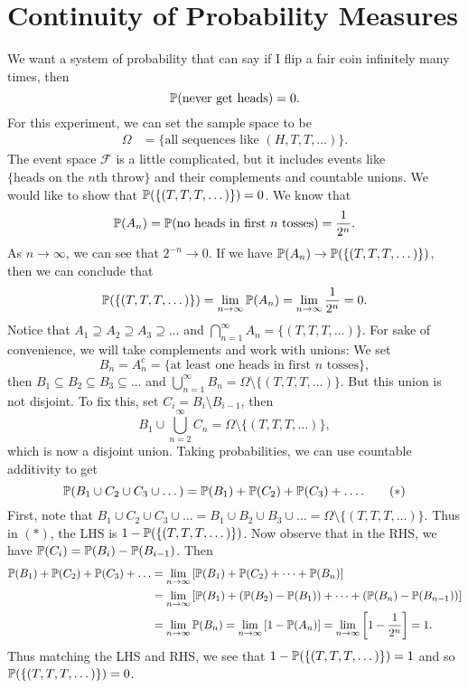 \section{Continuity of Probability Measures}
\begin{remark}
  We want a system of probability that can say
  if I flip a fair coin infinitely many times,
  then
  \[
    \mathbb{P}(\text{never get heads}) = 0
  .\]
  For this experiment, we can set the sample
  space to be
  \begin{align*}
    \Omega &= \{\text{all sequences like } (H, T, T, \dots)\}.
  \end{align*}
  The event space $\mathcal{F}$ is a little
  complicated, but it includes events like
  $\{\text{heads on the $n$th throw}\}$ and their
  complements and countable unions. We would like
  to show that $\mathbb{P}(\{(T, T, T, \dots)\}) = 0$.
  We know that
  \[
    \mathbb{P}(A_n) = \mathbb{P}(\text{no heads in first $n$ tosses}) = \frac{1}{2^n}.
  \]
  As $n \to \infty$, we can see that $2^{-n} \to 0$.
  If we have
  $\mathbb{P}(A_n) \to \mathbb{P}(\{(T, T, T, \dots)\})$, then
  we can conclude that
  \[
    \mathbb{P}(\{(T, T, T, \dots)\})
    = \lim_{n \to \infty} \mathbb{P}(A_n)
    = \lim_{n \to \infty} \frac{1}{2^n} = 0.
  \]
  Notice that $A_1 \supseteq A_2 \supseteq A_3 \supseteq \dots$
  and $\bigcap_{n = 1}^\infty A_n = \{(T, T, T, \dots)\}$.
  For sake of convenience, we will take
  complements and work with unions: We set
  \[
    B_n = A_n^c = \{\text{at least one heads in first $n$ tosses}\},
  \]
  then $B_1 \subseteq B_2 \subseteq B_3 \subseteq \dots$
  and $\bigcup_{n = 1}^\infty B_n = \Omega \setminus \{(T, T, T, \dots)\}$.
  But this union is not disjoint. To fix this, set
  $C_i = B_i \setminus B_{i - 1}$, then
  \[
    B_1 \cup \bigcup_{n = 2}^\infty C_n = \Omega \setminus \{(T, T, T, \dots)\},
  \]
  which is now a disjoint union. Taking probabilities,
  we can use countable additivity to get
  \[
    \mathbb{P}(B_1 \cup C_2 \cup C_3 \cup \dots)
    = \mathbb{P}(B_1) + \mathbb{P}(C_2) + \mathbb{P}(C_3) + \dots.
    \tag{$*$}
  \]
  First, note that
  $B_1 \cup C_2 \cup C_3 \cup \dots = B_1 \cup B_2 \cup B_3 \cup \dots = \Omega \setminus \{(T, T, T, \dots)\}$.
  Thus in $(*)$, the LHS is $1 - \mathbb{P}(\{(T, T, T, \dots)\})$.
  Now observe that in the RHS, we have
  $\mathbb{P}(C_i) = \mathbb{P}(B_i) - \mathbb{P}(B_{i - 1})$.
  Then
  \begin{align*}
    \mathbb{P}(B_1) + \mathbb{P}(C_2) + \mathbb{P}(C_3) + \dots
    &= \lim_{n \to \infty} \left[\mathbb{P}(B_1) + \mathbb{P}(C_2) + \dots + \mathbb{P}(B_n)\right] \\
    &= \lim_{n \to \infty} \left[\mathbb{P}(B_1) + (\mathbb{P}(B_2) - \mathbb{P}(B_1)) + \dots + (\mathbb{P}(B_n) - \mathbb{P}(B_{n - 1}))\right] \\
    &= \lim_{n \to \infty} \mathbb{P}(B_n)
    = \lim_{n \to \infty} \left[1 - \mathbb{P}(A_n)\right]
    = \lim_{n \to \infty} \left[1 - \frac{1}{2^n}\right]
    = 1.
  \end{align*}
  Thus matching the LHS and RHS, we see that
  $1 - \mathbb{P}(\{(T, T, T, \dots)\}) = 1$ and so
  $\mathbb{P}(\{(T, T, T, \dots)\}) = 0$.
\end{remark}

